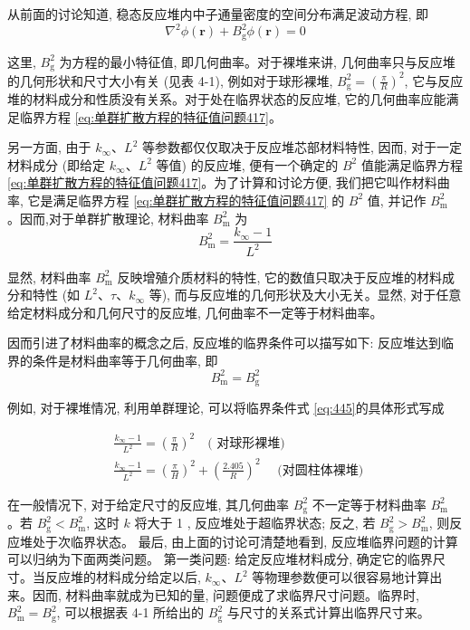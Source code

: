 \documentclass{Sichuan Normal University}
\begin{document}
    从前面的讨论知道, 稳态反应堆内中子通量密度的空间分布满足波动方程, 即
    \begin{equation}
\nabla^2 \phi(\boldsymbol{r})+B_{\mathrm{g}}^2 \phi(\boldsymbol{r})=0
\end{equation}

这里, $B_{\mathrm{g}}^2$ 为方程的最小特征值, 即几何曲率。对于裸堆来讲, 几何曲率只与反应堆的几何形状和尺寸大小有关 (见表 4-1), 例如对于球形裸堆, $B_{\mathrm{g}}^2=\left(\frac{\pi}{R}\right)^2$, 它与反应堆的材料成分和性质没有关系。对于处在临界状态的反应堆, 它的几何曲率应能满足临界方程 \eqref{eq:单群扩散方程的特征值问题417}。

另一方面, 由于 $k_{\infty} 、 L^2$ 等参数都仅仅取决于反应堆芯部材料特性, 因而, 对于一定材料成分 (即给定 $k_{\infty} 、 L^2$ 等值) 的反应堆, 便有一个确定的 $B^2$ 值能满足临界方程 \eqref{eq:单群扩散方程的特征值问题417}。为了计算和讨论方便, 我们把它叫作材料曲率, 它是满足临界方程 \eqref{eq:单群扩散方程的特征值问题417} 的 $B^2$ 值, 并记作 $B_{\mathrm{m}}^2$ 。因而,对于单群扩散理论, 材料曲率 $B_{\mathrm{m}}^2$ 为
\begin{equation}
B_{\mathrm{m}}^2=\frac{k_{\infty}-1}{L^2}
\end{equation}

显然, 材料曲率 $B_{\mathrm{m}}^2$ 反映增殖介质材料的特性, 它的数值只取决于反应堆的材料成分和特性 (如 $L^2 、 \tau 、 k_{\infty}$ 等), 而与反应堆的几何形状及大小无关。显然, 对于任意给定材料成分和几何尺寸的反应堆, 几何曲率不一定等于材料曲率。

因而引进了材料曲率的概念之后, 反应堆的临界条件可以描写如下: 反应堆达到临界的条件是材料曲率等于几何曲率, 即
\begin{equation}
B_{\mathrm{m}}^2=B_{\mathrm{g}}^2
\label{eq:单群扩散方程的特征值问题443}
\end{equation}

例如, 对于裸堆情况, 利用单群理论, 可以将临界条件式 \eqref{eq:445}的具体形式写成

\begin{align}
& \frac{k_{\infty}-1}{L^2}=\left(\frac{\pi}{R}\right)^2 \quad(\text { 对球形裸堆) } \label{eq:444}\\
& \frac{k_{\infty}-1}{L^2}=\left(\frac{\pi}{H}\right)^2+\left(\frac{2.405}{R}\right)^2 \quad \text { (对圆柱体裸堆) }\label{eq:445}
\end{align}

在一般情况下, 对于给定尺寸的反应堆, 其几何曲率 $B_{\mathrm{g}}^2$ 不一定等于材料曲率 $B_{\mathrm{m}}^2$ 。若 $B_{\mathrm{g}}^2<B_{\mathrm{m}}^2$, 这时 $k$ 将大于 1 , 反应堆处于超临界状态; 反之, 若 $B_{\mathrm{g}}^2>B_{\mathrm{m}}^2$, 则反应堆处于次临界状态。
最后, 由上面的讨论可清楚地看到, 反应堆临界问题的计算可以归纳为下面两类问题。
第一类问题: 给定反应堆材料成分, 确定它的临界尺寸。当反应堆的材料成分给定以后, $k_{\infty} 、 L^2$ 等物理参数便可以很容易地计算出来。因而, 材料曲率就成为已知的量, 问题便成了求临界尺寸问题。临界时, $B_{\mathrm{m}}^2=B_{\mathrm{g}}^2$, 可以根据表 4-1 所给出的 $B_{\mathrm{g}}^2$ 与尺寸的关系式计算出临界尺寸来。
\end{document}

